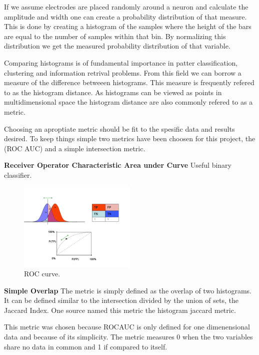 \documentclass[altfont, fleqn]{uiophd}
\begin{document}
If we assume electrodes are placed randomly around a neuron and calculate
the amplitude and width one can create a probability distribution
of that measure. 
This is done by creating a histogram of the samples 
where the height of the bars are equal to the number of samples within 
that bin. 
By normalizing this distribution we get the measured probability distribution
of that variable. 

Comparing histograms is of fundamental importance in patter classification, 
clustering and information retrival problems. 
From this field we can borrow a measure of the difference betweeen histograms. 
This measure is frequently refered to as the histogram distance. 
As histograms can be viewed as points in multidimensional space 
the histogram distance are also commonly refered to as a metric. 

Choosing an aproptiate metric should be fit to the spesific data and results
desired. 
To keep things simple two metrics have been choosen for this project, 
the (ROC AUC) and a simple intersection metric. 

\noindent
{\bf Receiver Operator Characteristic Area under Curve}
Useful binary classifier. 
\begin{figure}[h]
    \begin{center}
        \includegraphics[width=0.5\textwidth]{images/sec_3/roc_curve.pdf}
        \caption{
            ROC curve. 
        }
        \label{fig:3_roc_auc}
    \end{center}
\end{figure}
\newline 

\noindent
{\bf Simple Overlap}
The metric is simply defined as the overlap
of two histograms. 
It can be defined similar to the intersection divided by the union of sets, 
the Jaccard Index. 
One source named this metric the histogram jaccard metric. 

This metric was chosen because ROCAUC is only defined for one
dimenensional data and because of its simplicity.
The metric measures 0 when the two variables share no data in common 
and 1 if compared to itself. 
\newline 
\end{document}
